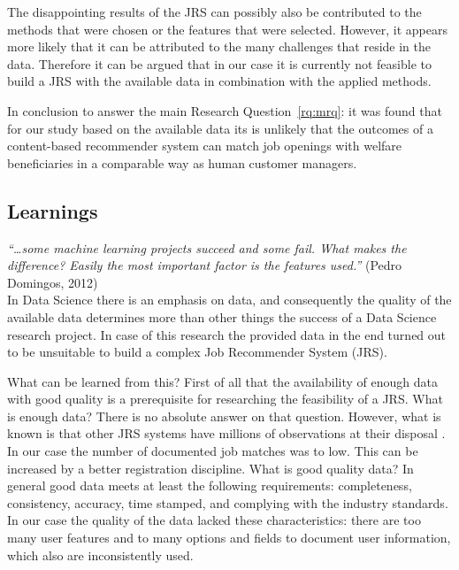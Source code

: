 The disappointing results of the JRS can possibly also be contributed to the methods that were chosen or the features that were selected. 
However, it appears more likely that it can be attributed to the many challenges that reside in the data.
Therefore it can be argued that in our case it is currently not feasible to build a JRS with the available data in combination with the applied methods. 

In conclusion to answer the main Research Question~\ref{rq:mrq}: it was found that for our study based on the available data its is unlikely that the outcomes of a content-based recommender system can match job openings with welfare beneficiaries in a comparable way as human customer managers. 
\subsection{Learnings}
\label{ssec:learnings}

\textit{“…some machine learning projects succeed and some fail. What makes the difference?  Easily the most important factor is the features used.”} (Pedro Domingos, 2012) \nocite{domingos2012few} \\

\noindent In Data Science there is an emphasis on data, and consequently the quality of the available data determines more than other things the success of a Data Science research project.
In case of this research the provided data in the end turned out to be unsuitable to build a complex Job Recommender System (JRS). 

What can be learned from this? 
First of all that the availability of enough data with good quality is a prerequisite for researching the feasibility of a JRS.
What is enough data?
There is no absolute answer on that question. 
However, what is known is that other JRS systems have millions of observations at their disposal \cite{kenthapadi2017personalized, T.Al-Otaibi2012ASystems, Zheng2012JobSurvey, hong2013job}.
In our case the number of documented job matches was to low. 
This can be increased by a better registration discipline.
What is good quality data?
In general good data meets at least the following requirements: completeness, consistency, accuracy, time stamped, and complying with the industry standards. 
In our case the quality of the data lacked these characteristics: there are too many user features and to many options and fields to document user information, which also are inconsistently used. 

